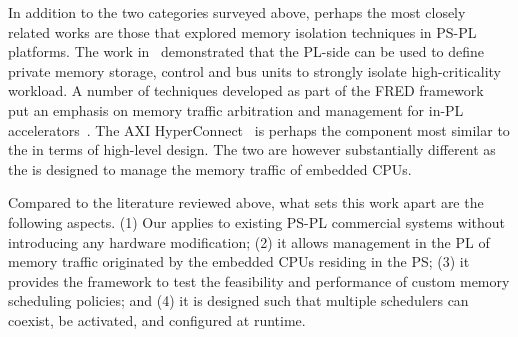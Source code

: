 In addition to the two categories surveyed above, perhaps the most
closely related works are those that explored memory isolation
techniques in PS-PL platforms. The work
in~\cite{gracioli2019designing} demonstrated that the PL-side can be
used to define private memory storage, control and bus units to
strongly isolate high-criticality workload. A number of techniques
developed as part of the FRED framework~\cite{fred_ssup} put an
emphasis on memory traffic arbitration and management for in-PL
accelerators~\cite{fred_hyperconnect, fred_abe}. The AXI
HyperConnect~\cite{fred_hyperconnect} is perhaps the component most
similar to the \schim in terms of high-level design. The two are
however substantially different as the \schim is designed to manage
the memory traffic of embedded CPUs.

Compared to the literature reviewed above, what sets this work apart
are the following aspects. (1) Our \schim applies to existing PS-PL
commercial systems without introducing any hardware modification; (2)
it allows management in the PL of memory traffic originated by the
embedded CPUs residing in the PS; (3) it provides the framework to
test the feasibility and performance of custom memory scheduling
policies; and (4) it is designed such that multiple schedulers can
coexist, be activated, and configured at runtime.



